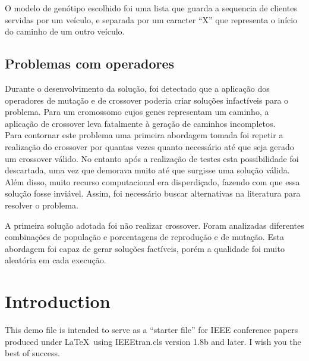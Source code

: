 \documentclass[conference]{IEEEtran}
\begin{document}
O modelo de genótipo escolhido foi uma lista que guarda a sequencia de clientes servidas por um veículo, e separada por um caracter ``X'' que representa o início do caminho de um outro veículo.

\subsection{Problemas com operadores}
Durante o desenvolvimento da solução, foi detectado que a aplicação dos operadores de mutação e de crossover poderia criar soluções infactíveis para o problema. Para um cromossomo cujos genes representam um caminho, a aplicação de crossover leva fatalmente à geração de caminhos incompletos.\\

Para contornar este problema uma primeira abordagem tomada foi repetir a realização do crossover por quantas vezes quanto necessário até que seja gerado um crossover válido. No entanto após a realização de testes esta possibilidade foi descartada, uma vez que demorava muito até que surgisse uma solução válida. Além disso, muito recurso computacional era disperdiçado, fazendo com que essa solução fosse inviável. Assim, foi necessário buscar alternativas na literatura para resolver o problema.


A primeira solução adotada foi não realizar crossover. Foram analizadas diferentes combinações de população e porcentagens de reprodução e de mutação. Esta abordagem foi capaz de gerar soluções factíveis, porém a qualidade foi muito aleatória em cada execução.

%
\IEEEpeerreviewmaketitle



\section{Introduction}
This demo file is intended to serve as a ``starter file''
for IEEE conference papers produced under \LaTeX\ using
IEEEtran.cls version 1.8b and later.
I wish you the best of success.
\end{document}

